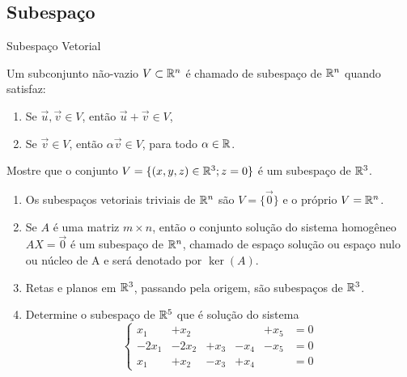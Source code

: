 
\subsection*{Subespaço}
\begin{frame}[label=lild]{Subespaço Vetorial}
\begin{defin}
Um subconjunto {\color{red}não-vazio} $V\subset\mathbb{R}^n$ é chamado de {\color{blue} subespaço} de $\mathbb{R}^n$ quando satisfaz:
\begin{enumerate}
\item Se $\vec{u},\vec{v}\in V$, então $\vec{u}+\vec{v}\in V$,
\item Se $\vec{v}\in V$, então $\alpha\vec{v}\in V$, para todo $\alpha\in \mathbb{R}$.
\end{enumerate}
\end{defin}

\begin{exe}
Mostre que o conjunto $V=\{(x,y,z)\in \mathbb{R}^3;z=0\}$ é um subespaço de $\mathbb{R}^3$.
\end{exe}

\end{frame}

\begin{frame}[label=lild]{}
\begin{exe}
\begin{enumerate}
\item Os subespaços vetoriais triviais de $\mathbb{R}^n$ são $V=\{\vec{0}\}$ e o próprio $V=\mathbb{R}^n$.

\item Se $A$ é uma matriz $m\times n$, então o conjunto solução do sistema homogêneo $AX=\vec{0}$ é um subespaço de $\mathbb{R}^n$, chamado de {\color{blue}espaço solução} ou {\color{blue}espaço nulo} ou {\color{blue}núcleo de A} e será denotado por {\color{blue} $\ker(A)$}.

\item Retas e planos em $\mathbb{R}^3$, passando pela origem, são subespaços de $\mathbb{R}^3$.

\item Determine o subespaço de $\mathbb{R}^5$ que é solução do sistema 
\[\left\{
\begin{array}{rrrrrr}
x_1 &+ x_2 & & &+x_5&=0\\
-2x_1 & -2x_2 &+ x_3& -x_4 & -x_5& =0 \\
x_1&+ x_2& -x_3 &+ x_4& &=0
\end{array}\right.
\]
\end{enumerate}
\end{exe}


\end{frame}

